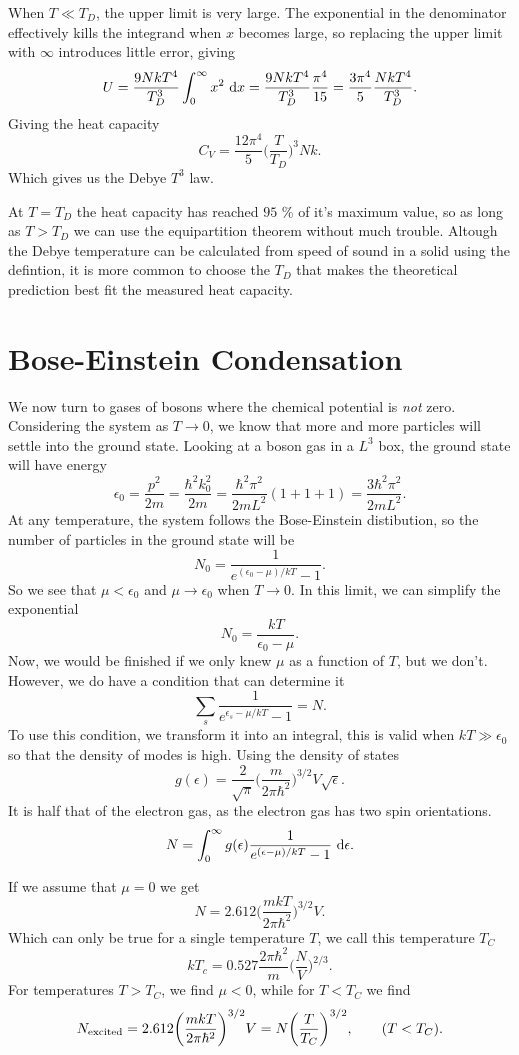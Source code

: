 \documentclass[a4paper, 11pt, notitlepage, english]{article}
\renewcommand{\d}{{\rm d}}
\newcommand{\eps}{\epsilon}
\begin{document}
When $T \ll T_D$, the upper limit is very large. The exponential in the denominator effectively kills the integrand when $x$ becomes large, so replacing the upper limit with $\infty$ introduces little error, giving
$$U = \frac{9NkT^4}{T_D^3}\int_0^\infty x^2 \ \d x = \frac{9NkT^4}{T_D^3} \frac{\pi^4}{15} = \frac{3\pi^4}{5} \frac{NkT^4}{T_D^3}.$$
Giving the heat capacity
$$C_V = \frac{12\pi^4}{5}\bigg(\frac{T}{T_D}\bigg)^3Nk.$$
Which gives us the Debye $T^3$ law.

At $T = T_D$ the heat capacity has reached $95$ \% of it's maximum value, so as long as $T > T_D$ we can use the equipartition theorem without much trouble. Altough the Debye temperature can be calculated from speed of sound in a solid using the defintion, it is more common to choose the $T_D$ that makes the theoretical prediction best fit the measured heat capacity.


\section*{Bose-Einstein Condensation}

We now turn to gases of bosons where the chemical potential is \emph{not} zero. Considering the system as $T \to 0$, we know that more and more particles will settle into the ground state. Looking at a boson gas in a $L^3$ box, the ground state will have energy
$$\eps_0 = \frac{p^2}{2m} = \frac{\hbar^2k_0^2}{2m} = \frac{\hbar^2 \pi^2}{2mL^2}(1+1+1) = \frac{3\hbar^2 \pi^2}{2mL^2}.$$
At any temperature, the system follows the Bose-Einstein distibution, so the number of particles in the ground state will be
$$N_0 = \frac{1}{e^{(\eps_0 - \mu)/kT} - 1}.$$
So we see that $\mu < \eps_0$ and $\mu \to \eps_0$ when $T\to 0$. In this limit, we can simplify the exponential
$$N_0 = \frac{kT}{\eps_0 - \mu}.$$
Now, we would be finished if we only knew $\mu$ as a function of $T$, but we don't. However, we do have a condition that can determine it
$$\sum_s \frac{1}{e^{\eps_s -\mu/kT} - 1} = N.$$
To use this condition, we transform it into an integral, this is valid when $kT \gg \eps_0$ so that the density of modes is high. Using the density of states
$$g(\eps) = \frac{2}{\sqrt{\pi}}\bigg(\frac{m}{2\pi\hbar^2}\bigg)^{3/2} V \sqrt{\eps}.$$
It is half that of the electron gas, as the electron gas has two spin orientations.
$$N = \int_0^\infty g(\eps) \frac{1}{e^{(\eps-\mu)/kT}-1}\ \d \eps.$$

If we assume that $\mu = 0$ we get
$$N = 2.612\bigg(\frac{m kT}{2\pi \hbar^2}\bigg)^{3/2}V.$$
Which can only be true for a single temperature $T$, we call this temperature $T_C$
$$kT_c = 0.527 \frac{2\pi \hbar^2}{m}\bigg(\frac{N}{V}\bigg)^{2/3}.$$
For temperatures $T>T_C$, we find $\mu < 0$, while for $T<T_C$ we find
$$N_{\rm excited} = 2.612 \bigg(\frac{mkT}{2\pi\hbar^2}\bigg)^{3/2}V = N\bigg(\frac{T}{T_C}\bigg)^{3/2}, \qquad (T < T_C).$$
\end{document}
